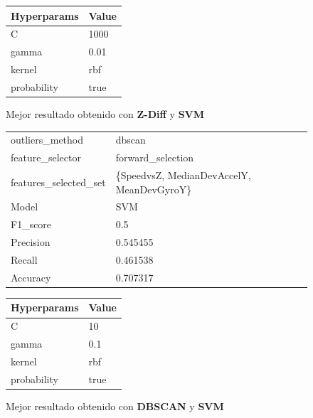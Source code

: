 \begin{appendices}
\begin{figure}[htb]
			\begin{tabular}{ll}
				\toprule
				Hyperparams & Value \\
				\midrule
						  C &  1000 \\
					  gamma &  0.01 \\
					 kernel &   rbf \\
				probability &  true \\
				\bottomrule
			\end{tabular}
			\caption{Mejor resultado obtenido con \textbf{Z-Diff} y \textbf{SVM}}
			\label{table:23}
		\end{figure}

		\begin{figure}[htb]
			\centering
			\begin{tabular}{ll}
				\toprule
					  outliers\_method &                                    dbscan \\
					 feature\_selector &                         forward\_selection \\
				features\_selected\_set & \{SpeedvsZ, MedianDevAccelY, MeanDevGyroY\} \\
								Model &                                       SVM \\
						F1\_score &                                       0.5 \\
					   Precision &                                  0.545455 \\
						  Recall &                                  0.461538 \\
						Accuracy &                                  0.707317 \\
				\bottomrule
			\end{tabular}
			\newline
			\newline

			\begin{tabular}{ll}
				\toprule
				Hyperparams & Value \\
				\midrule
						  C &    10 \\
					  gamma &   0.1 \\
					 kernel &   rbf \\
				probability &  true \\
				\bottomrule
			\end{tabular}
			\caption{Mejor resultado obtenido con \textbf{DBSCAN} y \textbf{SVM}}
			\label{table:24}
		\end{figure}


\end{appendices}
